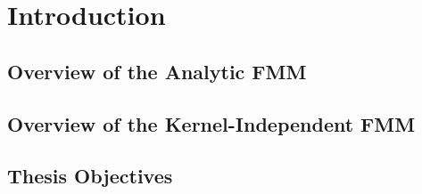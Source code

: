 \chapter{Introduction}\label{chpt:1_introduction}
\section{Overview of the Analytic FMM}\label{sec:1_1_fmm_overview}

\section{Overview of the Kernel-Independent FMM}\label{sec:1_2_kifmm_overview}

\section{Thesis Objectives}
